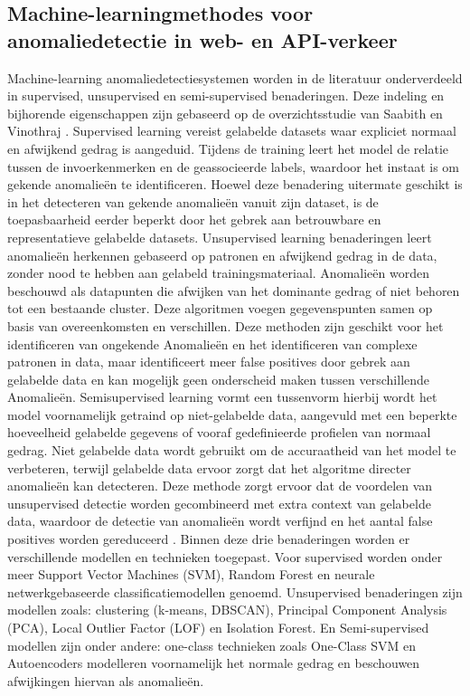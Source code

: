 \subsection{Machine-learningmethodes voor anomaliedetectie in web- en API-verkeer}

Machine-learning anomaliedetectiesystemen worden in de literatuur onderverdeeld in supervised, unsupervised en semi-supervised benaderingen. Deze indeling en bijhorende eigenschappen zijn gebaseerd op de overzichtsstudie van Saabith en Vinothraj \Autocite{Saabith2023}.
Supervised learning vereist gelabelde datasets waar expliciet normaal en afwijkend gedrag is aangeduid. Tijdens de training leert het model de relatie tussen de invoerkenmerken en de geassocieerde labels, waardoor het instaat is om gekende anomalieën te identificeren. Hoewel deze benadering uitermate geschikt is in het detecteren van gekende anomalieën vanuit zijn dataset, is de toepasbaarheid eerder beperkt door het gebrek aan betrouwbare en representatieve gelabelde datasets.
Unsupervised learning benaderingen leert anomalieën herkennen gebaseerd op patronen en afwijkend gedrag in de data, zonder nood te hebben aan gelabeld trainingsmateriaal. Anomalieën worden beschouwd als datapunten die afwijken van het dominante gedrag of niet behoren tot een bestaande cluster. Deze algoritmen voegen gegevenspunten samen op basis van overeenkomsten en verschillen. Deze methoden zijn geschikt voor het identificeren van ongekende Anomalieën en het identificeren van complexe patronen in data, maar identificeert meer false positives door gebrek aan gelabelde data en kan mogelijk geen onderscheid maken tussen verschillende Anomalieën.
Semisupervised learning vormt een tussenvorm hierbij wordt het model voornamelijk getraind op niet-gelabelde data, aangevuld met een beperkte hoeveelheid gelabelde gegevens of vooraf gedefinieerde profielen van normaal gedrag. Niet gelabelde data wordt gebruikt om de accuraatheid van het model te verbeteren, terwijl gelabelde data ervoor zorgt dat het algoritme directer anomalieën kan detecteren. Deze methode zorgt ervoor dat de voordelen van unsupervised detectie worden gecombineerd met extra context van gelabelde data, waardoor de detectie van anomalieën wordt verfijnd en het aantal false positives worden gereduceerd \Autocite{Saabith2023}.
Binnen deze drie benaderingen worden er verschillende modellen en technieken toegepast. Voor supervised worden onder meer Support Vector Machines (SVM), Random Forest en neurale netwerkgebaseerde classificatiemodellen genoemd. Unsupervised benaderingen zijn modellen zoals: clustering (k-means, DBSCAN), Principal Component Analysis (PCA), Local Outlier Factor (LOF) en Isolation Forest. En Semi-supervised modellen zijn onder andere: one-class technieken zoals One-Class SVM en Autoencoders modelleren voornamelijk het normale gedrag en beschouwen afwijkingen hiervan als anomalieën.\Autocite{Schummer2024} 

